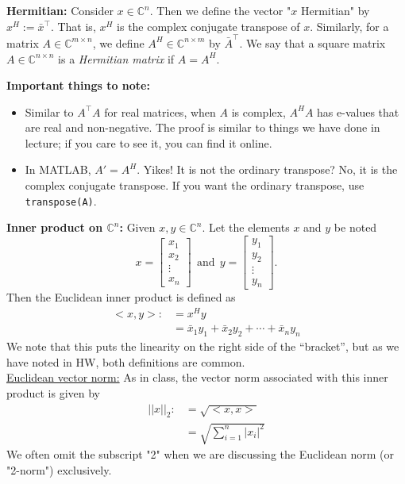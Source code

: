 \documentclass[letterpaper]{article}
\newcommand{\cp}{\mathbb C}    %
\begin{document}
 \noindent \textbf{Hermitian:}
 Consider $x\in \cp^n$. Then we define the vector "$x$ Hermitian" by $x^H:=\bar{x}^\top$. That is, $x^H$ is the complex conjugate transpose of $x$. Similarly, for a matrix $A\in \cp^{m\times n}$, we define $A^H \in \cp^{n\times m}$ by $\bar{A}^\top$. We say that a square matrix  $A\in \cp^{n\times n}$ is a \textit{Hermitian matrix} if $A=A^H$.

\noindent \textbf{Important things to note:}
\begin{itemize}
\item Similar to $A^\top A$ for real matrices, when $A$ is complex, $A^HA$ has e-values that are real and non-negative. The proof is similar to things we have done in lecture; if you care to see it, you can find it online.

\item In MATLAB, $A'= A^H$. Yikes! It is not the ordinary transpose? No, it is the complex conjugate transpose. If you want the ordinary transpose, use \texttt{transpose(A)}.
\end{itemize}





\vspace*{2cm}

\noindent \textbf{Inner product on $\cp^n$:} Given $x,y \in \cp^n$. Let the elements $x$ and $y$ be noted
$$x=\begin{bmatrix}x_1 \\ x_2 \\ \vdots \\ x_n \end{bmatrix} ~~\mbox{and} ~~y=\begin{bmatrix}y_1 \\ y_2 \\ \vdots \\ y_n \end{bmatrix}.$$
Then the Euclidean inner product is defined as
\begin{align}
<x,y>:&=x^H y \\ &=\bar{x}_1 y_1 +\bar{x}_2 y_2+\cdots+\bar{x}_n y_n
\end{align}
We note that this puts the linearity on the right side of the ``bracket'', but as we have noted in HW, both definitions are common.\\



\noindent \underline{Euclidean vector norm:} As in class, the vector norm associated with this inner product is given by
\begin{align}||x||_2:&=\sqrt{<x,x>} \\
&=\sqrt{\sum\limits_{i=1}^n |x_i|^2 }\end{align}
We often omit the subscript "2"  when we are discussing the Euclidean norm (or "2-norm") exclusively.
\end{document}
